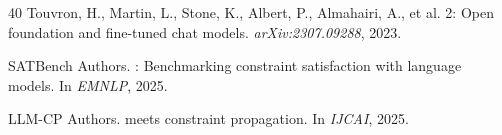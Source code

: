 \documentclass[11pt,a4paper]{article}
\begin{document}
\begin{thebibliography}{40}
Touvron, H., Martin, L., Stone, K., Albert, P., Almahairi, A., et al.
 2: Open foundation and fine-tuned chat models.
\newblock \emph{arXiv:2307.09288}, 2023.

{SATBench Authors}.
: Benchmarking constraint satisfaction with language models.
\newblock In \emph{EMNLP}, 2025.

{LLM-CP Authors}.
 meets constraint propagation.
\newblock In \emph{IJCAI}, 2025.

\end{thebibliography}
\end{document}

